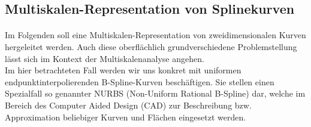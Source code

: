 \documentclass{article}
\newcommand{\R}{{\rm I\!R}}
\begin{document}
\subsection{Multiskalen-Representation von Splinekurven}
%
\paragraph{}
%
%
%
Im Folgenden soll eine Multiskalen-Representation von zweidimensionalen Kurven hergeleitet werden. Auch diese oberflächlich grundverschiedene Problemstellung lässt sich im Kontext der Multiskalenanalyse angehen. \\
%
Im hier betrachteten Fall werden wir uns konkret mit uniformen endpunktinterpolierenden B-Spline-Kurven beschäftigen. Sie stellen einen Spezialfall so genannter NURBS (Non-Uniform Rational B-Spline) dar, welche im Bereich des Computer Aided Design (CAD) zur Beschreibung bzw. Approximation beliebiger Kurven und Flächen eingesetzt werden.
%
\end{document}
